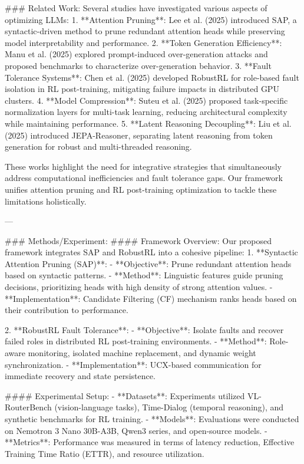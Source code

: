 ### Related Work:
Several studies have investigated various aspects of optimizing LLMs:
1. **Attention Pruning**: Lee et al. (2025) introduced SAP, a syntactic-driven method to prune redundant attention heads while preserving model interpretability and performance.
2. **Token Generation Efficiency**: Manu et al. (2025) explored prompt-induced over-generation attacks and proposed benchmarks to characterize over-generation behavior.
3. **Fault Tolerance Systems**: Chen et al. (2025) developed RobustRL for role-based fault isolation in RL post-training, mitigating failure impacts in distributed GPU clusters.
4. **Model Compression**: Suteu et al. (2025) proposed task-specific normalization layers for multi-task learning, reducing architectural complexity while maintaining performance.
5. **Latent Reasoning Decoupling**: Liu et al. (2025) introduced JEPA-Reasoner, separating latent reasoning from token generation for robust and multi-threaded reasoning.

These works highlight the need for integrative strategies that simultaneously address computational inefficiencies and fault tolerance gaps. Our framework unifies attention pruning and RL post-training optimization to tackle these limitations holistically.

---

### Methods/Experiment:
#### Framework Overview:
Our proposed framework integrates SAP and RobustRL into a cohesive pipeline:
1. **Syntactic Attention Pruning (SAP)**:
   - **Objective**: Prune redundant attention heads based on syntactic patterns.
   - **Method**: Linguistic features guide pruning decisions, prioritizing heads with high density of strong attention values.
   - **Implementation**: Candidate Filtering (CF) mechanism ranks heads based on their contribution to performance.

2. **RobustRL Fault Tolerance**:
   - **Objective**: Isolate faults and recover failed roles in distributed RL post-training environments.
   - **Method**: Role-aware monitoring, isolated machine replacement, and dynamic weight synchronization.
   - **Implementation**: UCX-based communication for immediate recovery and state persistence.

#### Experimental Setup:
- **Datasets**: Experiments utilized VL-RouterBench (vision-language tasks), Time-Dialog (temporal reasoning), and synthetic benchmarks for RL training.
- **Models**: Evaluations were conducted on Nemotron 3 Nano 30B-A3B, Qwen3 series, and open-source models.
- **Metrics**: Performance was measured in terms of latency reduction, Effective Training Time Ratio (ETTR), and resource utilization.

